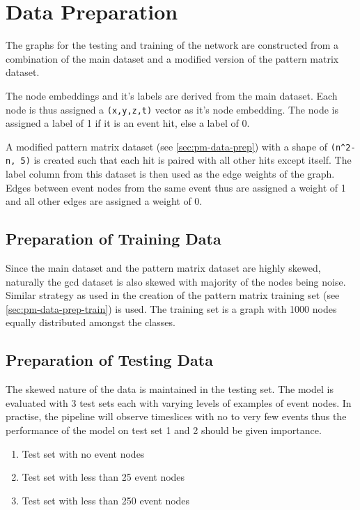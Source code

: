 \section{Data Preparation}
\label{sec:gcd-data-prep}

The graphs for the testing and training of the network are constructed
from a combination of the main dataset and a modified version of the
pattern matrix dataset.

The node embeddings and it's labels are derived from the main dataset.
Each node is thus assigned a \texttt{(x,y,z,t)} vector as it's node
embedding. The node is assigned a label of 1 if it is an event hit,
else a label of 0.

A modified pattern matrix dataset (see \ref{sec:pm-data-prep}) with a
shape of \texttt{(n^{2}-n, 5)} is created such that each hit is paired
with all other hits except itself. The label column from this dataset
is then used as the edge weights of the graph. Edges between event
nodes from the same event thus are assigned a weight of 1 and all
other edges are assigned a weight of 0.

\subsection{Preparation of Training Data}
\label{sec:gcd-data-prep-train}

Since the main dataset and the pattern matrix dataset are highly
skewed, naturally the gcd dataset is also skewed with majority of the
nodes being noise. Similar strategy as used in the creation of the
pattern matrix training set (see \ref{sec:pm-data-prep-train}) is
used. The training set is a graph with 1000 nodes equally distributed
amongst the classes.

\subsection{Preparation of Testing Data}
\label{sec:gcd-data-prep-test}

The skewed nature of the data is maintained in the testing set. The
model is evaluated with 3 test sets each with varying levels of
examples of event nodes. In practise, the pipeline will observe
timeslices with no to very few events thus the performance of the
model on test set 1 and 2 should be given importance.

\begin{enumerate}
\item Test set with no event nodes
\item Test set with less than 25 event nodes
\item Test set with less than 250 event nodes
\end{enumerate}

